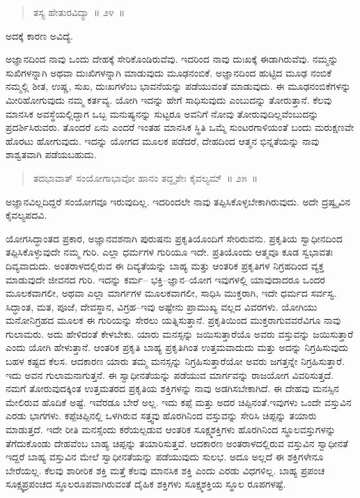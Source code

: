 \vspace{-0.3cm}

\begin{verse}
ತಸ್ಯ ಹೇತುರವಿದ್ಯಾ~॥ ೨೪~॥
\end{verse}

\vspace{-0.3cm}

ಅದಕ್ಕೆ ಕಾರಣ ಅವಿದ್ಯೆ. 

ಅಜ್ಞಾನದಿಂದ ನಾವು ಒಂದು ದೇಹಕ್ಕೆ ಸೇರಿಕೊಂಡಿರುವೆವು. ಇದರಿಂದ ನಾವು ದುಃಖಕ್ಕೆ ಈಡಾಗಿರುವೆವು. ನಮ್ಮನ್ನು ಸುಖಿಗಳನ್ನಾಗಿ ಅಥವಾ ದುಃಖಿಗಳನ್ನಾಗಿ ಮಾಡುವುದು ಮೂಢನಂಬಿಕೆ. ಅಜ್ಞಾನದಿಂದ ಹುಟ್ಟಿದ ಮೂಢ ನಂಬಿಕೆ ನಮ್ಮಲ್ಲಿ ಶೀತ, ಉಷ್ಣ, ಸುಖ, ದುಃಖಗಳೆಂಬ ಭಾವನೆಯನ್ನು ಪಡೆಯುವಂತೆ ಮಾಡುವುದು. ಈ ಮೂಢನಂಬಿಕೆಗಳನ್ನು ಮೀರಿಹೋಗುವುದು ನಮ್ಮ ಕರ್ತವ್ಯ. ಯೋಗಿ ಇದನ್ನು ಹೇಗೆ ಸಾಧಿಸುವುದು ಎಂಬುದನ್ನು ತೋರುತ್ತಾನೆ. ಕೆಲವು ಮಾನಸಿಕ ಅವಸ್ಥೆಯಲ್ಲಿದ್ದಾಗ ಒಬ್ಬ ಮನುಷ್ಯನನ್ನು ಸುಟ್ಟರೂ ಅವನಿಗೆ ನೋವು ತೋರುವುದಿಲ್ಲವೆಂಬುದನ್ನು ಪ್ರದರ್ಶಿಸಿರುವರು. ತೊಂದರೆ ಏನು ಎಂದರೆ ಇಂತಹ ಮಾನಸಿಕ ಸ್ಥಿತಿ ಒಮ್ಮೆ ಸುಂಟರಗಾಳಿಯಂತೆ ಬಂದು ಮರುಕ್ಷಣವೇ ಹೊರಟು ಹೋಗುವುದು. ಇದನ್ನು ಯೋಗದ ಮೂಲಕ ಪಡೆದರೆ, ದೇಹದಿಂದ ಆತ್ಮನ ಭಿನ್ನತೆಯನ್ನು ನಾವು ಶಾಶ್ವತವಾಗಿ ಪಡೆಯಬಹುದು. 

\vskip -0.3cm

\begin{verse}
ತದಭಾವಾತ್​ ಸಂಯೋಗಾಭಾವೋ ಹಾನಂ ತದ್ದೃಶೇಃ ಕೈವಲ್ಯಮ್​~॥ ೨೫~॥
\end{verse}

\vskip -0.3cm

ಅಜ್ಞಾನವಿಲ್ಲದಿದ್ದರೆ ಸಂಯೋಗವೂ ಇರುವುದಿಲ್ಲ. ಇದರಿಂದಲೇ ನಾವು ತಪ್ಪಿಸಿಕೊಳ್ಳಬೇಕಾಗಿರುವುದು. ಅದೇ ದ್ರಷ್ವೃವಿನ ಕೈವಲ್ಯಪದವಿ. 

ಯೋಗಸಿದ್ಧಾಂತದ ಪ್ರಕಾರ, ಅಜ್ಞಾನವಶನಾಗಿ ಪುರುಷನು ಪ್ರಕೃತಿಯೊಂದಿಗೆ ಸೇರಿರುವನು. ಪ್ರಕೃತಿಯ ಸ್ವಾಧೀನದಿಂದ ತಪ್ಪಿಸಿಕೊಳ್ಳುವುದೇ ನಮ್ಮ ಗುರಿ. ಎಲ್ಲಾ ಧರ್ಮಗಳ ಗುರಿಯೂ ಇದೇ. ಪ್ರತಿಯೊಂದು ಆತ್ಮವೂ ಕೂಡ ಸ್ವಭಾವತಃ ದಿವ್ಯವಾದುದು. ಅಂತರಾಳದಲ್ಲಿರುವ ಈ ದಿವ್ಯತೆಯನ್ನು ಬಾಹ್ಯ ಮತ್ತು ಆಂತರಿಕ ಪ್ರಕೃತಿಗಳ ನಿಗ್ರಹದಿಂದ ವ್ಯಕ್ತ ಮಾಡುವುದೇ ಜೀವನದ ಗುರಿ. ಇದನ್ನು ಕರ್ಮ– ಭಕ್ತಿ–ಜ್ಞಾನ–ಯೋಗ ಇವುಗಳಲ್ಲಿ ಯಾವುದಾದರೂ ಒಂದರ ಮೂಲಕವಾಗಲೀ, ಅಥವಾ ಎಲ್ಲಾ ಮಾರ್ಗಗಳ ಮೂಲಕವಾಗಲೀ, ಸಾಧಿಸಿ ಮುಕ್ತರಾಗಿ, ಇದೇ ಧರ್ಮದ ಸರ್ವಸ್ವ. ಸಿದ್ಧಾಂತ, ಮತ, ಪೂಜೆ, ದೇವಸ್ಥಾನ, ವಿಗ್ರಹ–ಇವು ಅಷ್ಟೇನು ಪ್ರಾಮುಖ್ಯ ವಲ್ಲದ ವಿವರಗಳು. ಯೋಗಿಯು ಮನೋನಿಗ್ರಹದ ಮೂಲಕ ಈ ಗುರಿಯನ್ನು ಸೇರಲು ಯತ್ನಿಸುತ್ತಾನೆ. ಪ್ರಕೃತಿಯಿಂದ ಮುಕ್ತರಾಗುವವರೆವಿಗೂ ನಾವು ಗುಲಾಮರು. ಅದು ಹೇಳಿದಂತೆ ಕೇಳಬೇಕು. ಯಾರು ಮನಸ್ಸನ್ನು ಜಯಿಸುತ್ತಾರೆಯೊ ಅವರು ವಸ್ತುವನ್ನು ಜಯಿಸುತ್ತಾರೆ ಎಂದು ಯೋಗಿ ಹೇಳುತ್ತಾನೆ. ಆಂತರಿಕ ಪ್ರಕೃತಿ ಬಾಹ್ಯ ಪ್ರಕೃತಿಗಿಂತ ಉತ್ತಮವಾದುದು ಮತ್ತು ಅದನ್ನು ನಿಗ್ರಹಿಸುವುದು ಬಹಳ ಕಷ್ಟದ ಕೆಲಸ. ಆದಕಾರಣ ಯಾರು ತಮ್ಮ ಮನಸ್ಸನ್ನು ನಿಗ್ರಹಿಸುತ್ತಾರೆಯೋ ಅವರು ಜಗತ್ತನ್ನೇ ನಿಗ್ರಹಿಸುತ್ತಾರೆ. ಇದು ಅವನ ಗುಲಾಮನಾಗುತ್ತನೆ. ಈ ಸ್ವಾಧೀನತೆಯನ್ನು ಪಡೆಯುವ ಮಾರ್ಗವನ್ನು ರಾಜಯೋಗ ವಿವರಿಸುತ್ತದೆ. ನಮಗೆ ತೋರುವುದಕ್ಕಿಂತ ಉತ್ತಮತರದ ಪ್ರಕೃತಿಯ ಶಕ್ತಿಗಳನ್ನು ನಾವು ಅಡಗಿಸಬೇಕಾಗಿದೆ. ಈ ದೇಹವು ಮನಸ್ಸಿನ ಮೇಲಿರುವ ಹೊದಿಕೆ ಅಷ್ಟೆ. ಇವೆರಡೂ ಬೇರೆ ಅಲ್ಲ. ಇದು ಕಪ್ಪೆ ಮತ್ತು ಅದರ ಚಿಪ್ಪಿನಂತೆ.\break ಇವುಗಳು ಒಂದೇ ವಸ್ತುವಿನ ಎರಡು ಭಾಗಗಳು. ಕಪ್ಪೆಚಿಪ್ಪಿನಲ್ಲಿ ಒಳಗಿರುವ ಸತ್ತ್ವವು ಹೊರಗಿನಿಂದ ವಸ್ತುವನ್ನು ಸೇರಿಸಿ ಚಿಪ್ಪನ್ನು ತಯಾರು ಮಾಡುತ್ತದೆ. ಇದೇ ರೀತಿ ಮನಸ್ಸೆಂದು ಕರೆಯಲ್ಪಡುವ ಆಂತರಿಕ ಸೂಕ್ಷ್ಮಶಕ್ತಿಗಳು ಹೊರಗಿನಿಂದ ಸ್ಥೂಲವಸ್ತುಗಳನ್ನು ತೆಗೆದುಕೊಂಡು ದೇಹವೆಂಬ ಬಾಹ್ಯ ಚಿಪ್ಪನ್ನು ತಯಾರಿಸುತ್ತವೆ. ಆದಕಾರಣ ಅಂತರಾಳದಲ್ಲಿರುವ ವಸ್ತುವಿನ ಸ್ವಾಧೀನತೆ ಇದ್ದರೆ ಬಾಹ್ಯ ವಸ್ತುವಿನ ಮೇಲೆ ಸ್ವಾಧೀನತೆಯನ್ನು ಪಡೆಯುವುದು ಸುಲಭ. ಅದೂ ಅಲ್ಲದೆ ಈ ಶಕ್ತಿಗಳೇನೂ ಬೇರೆಯಲ್ಲ. ಕೆಲವು ಶಾರೀರಿಕ ಶಕ್ತಿ ಮತ್ತೆ ಕೆಲವು ಮಾನಸಿಕ ಶಕ್ತಿ ಎಂದು ಎರಡು ವಿಧಗಳಿಲ್ಲ. ಬಾಹ್ಯ ಪ್ರಪಂಚ ಸೂಕ್ಷ್ಮಪ್ರಪಂಚದ ಸ್ಥೂಲರೂಪವಾಗಿರುವಂತೆ ದೈಹಿಕ ಶಕ್ತಿಗಳು ಸೂಕ್ಷ್ಮಶಕ್ತಿಯ ಸ್ಥೂಲ ರೂಪಗಳಷ್ಟೆ. 

